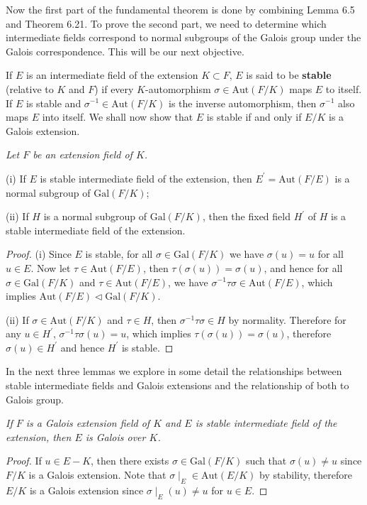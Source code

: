 Now the first part of the fundamental theorem is done by combining Lemma 6.5 and Theorem 6.21. To prove the second part, we need to determine which intermediate fields correspond to normal subgroups of the Galois group under the Galois correspondence. This will be our next objective.\par
If $E$ is an intermediate field of the extension $K\subset F$, $E$ is said to be \textbf{stable} (relative to $K$ and $F$) if every $K$-automorphism $\sigma\in\mathrm{Aut}(F/K)$ maps $E$ to itself. If $E$ is stable and $\sigma^{-1}\in\mathrm{Aut}(F/K)$ is the inverse automorphism, then $\sigma^{-1}$ also maps $E$ into itself. We shall now show that $E$ is stable if and only if $E/K$ is a Galois extension.
\begin{lemma}\em
Let $F$ be an extension field of $K$.\par
(i) If $E$ is stable intermediate field of the extension, then $E^\prime=\mathrm{Aut}(F/E)$ is a normal subgroup of $\mathrm{Gal}(F/K)$;\par
(ii) If $H$ is a normal subgroup of $\mathrm{Gal}(F/K)$, then the fixed field $H^\prime$ of $H$ is a stable intermediate field of the extension.
\end{lemma}
\begin{proof}
(i) Since $E$ is stable, for all $\sigma\in\mathrm{Gal}(F/K)$ we have $\sigma(u)=u$ for all $u\in E$. Now let $\tau\in\mathrm{Aut}(F/E)$, then $\tau(\sigma(u))=\sigma(u)$, and hence for all $\sigma\in\mathrm{Gal}(F/K)$ and $\tau\in\mathrm{Aut}(F/E)$, we have $\sigma^{-1}\tau\sigma\in\mathrm{Aut}(F/E)$, which implies $\mathrm{Aut}(F/E)\lhd\mathrm{Gal}(F/K)$.\par
(ii) If $\sigma\in\mathrm{Aut}(F/K)$ and $\tau\in H$, then $\sigma^{-1}\tau\sigma\in H$ by normality. Therefore for any $u\in H^\prime$, $\sigma^{-1}\tau\sigma(u)=u$, which implies $\tau(\sigma(u))=\sigma(u)$, therefore $\sigma(u)\in H^\prime$ and hence $H^\prime$ is stable.
\end{proof}
In the next three lemmas we explore in some detail the relationships between stable intermediate fields and Galois extensions and the relationship of both to Galois group.
\begin{lemma}\em
If $F$ is a Galois extension field of $K$ and $E$ is stable intermediate field of the extension, then $E$ is Galois over $K$.
\end{lemma}
\begin{proof}
If $u\in E-K$, then there exists $\sigma\in\mathrm{Gal}(F/K)$ such that $\sigma(u)\ne u$ since $F/K$ is a Galois extension. Note that $\sigma\mid_E\in\mathrm{Aut}(E/K)$ by stability, therefore $E/K$ is a Galois extension since $\sigma\mid_E(u)\ne u$ for $u\in E$.
\end{proof}
